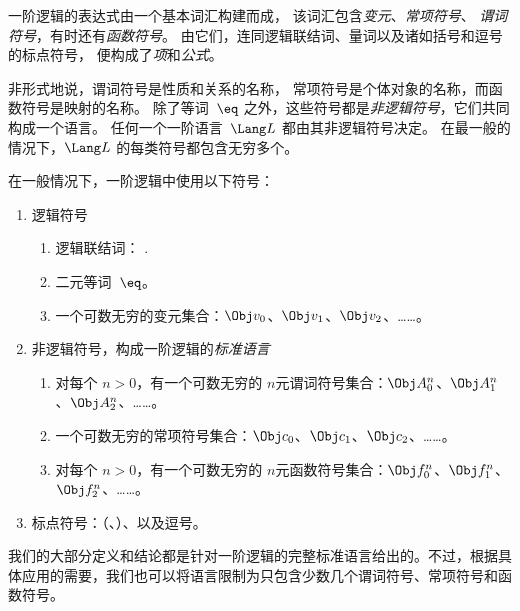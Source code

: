 \documentclass[../../../include/open-logic-section]{subfiles}
\begin{document}


一阶逻辑的表达式由一个基本词汇构建而成，
该词汇包含\emph{变元}、\emph{常项符号}、
\emph{谓词符号}，有时还有\emph{函数符号}。
由它们，连同逻辑联结词、量词以及诸如括号和逗号的标点符号，
便构成了\emph{项}和\emph{公式}。

\begin{explain}
非形式地说，谓词符号是性质和关系的名称，
常项符号是个体对象的名称，而函数符号是映射的名称。
除了等词~$\eq$ 之外，这些符号都是\emph{非逻辑符号}，它们共同构成一个语言。
任何一个一阶语言~$\Lang L$ 都由其非逻辑符号决定。
在最一般的情况下，$\Lang L$ 的每类符号都包含无穷多个。
\end{explain}

在一般情况下，一阶逻辑中使用以下符号：

\begin{enumerate}
\item 逻辑符号
\begin{enumerate}
\item 逻辑联结词：
  \startycommalist
  .
\item 二元等词~$\eq$。
\item 一个可数无穷的变元集合：$\Obj v_0$、$\Obj v_1$、$\Obj v_2$、……。
\end{enumerate}
\item 非逻辑符号，构成一阶逻辑的\emph{标准语言}
\begin{enumerate}
\item 对每个 $n>0$，有一个可数无穷的 $n$元谓词符号集合：$\Obj A^n_0$、$\Obj A^n_1$、$\Obj A^n_2$、……。
\item 一个可数无穷的常项符号集合：$\Obj c_0$、$\Obj c_1$、$\Obj c_2$、……。
\item 对每个 $n>0$，有一个可数无穷的 $n$元函数符号集合：$\Obj f^n_0$、$\Obj f^n_1$、$\Obj f^n_2$、……。
\end{enumerate}
\item 标点符号：（、）、以及逗号。
\end{enumerate}

我们的大部分定义和结论都是针对一阶逻辑的完整标准语言给出的。不过，根据具体应用的需要，我们也可以将语言限制为只包含少数几个谓词符号、常项符号和函数符号。
\end{document}

